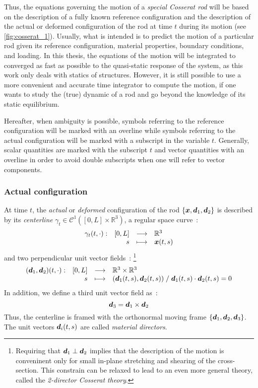 Thus, the equations governing the motion of a \emph{special Cosserat rod} will be based on the description of a fully known reference configuration and the description of the actual or deformed configuration of the rod at time $t$ during its motion (see \cref{fig:cosserat_1}). Usually, what is intended is to predict the motion of a particular rod given its reference configuration, material properties, boundary conditions, and loading. In this thesis, the equations of the motion will be integrated to converged as fast as possible to the quasi-static response of the system, as this work only deals with statics of structures. However, it is still possible to use a more convenient and accurate time integrator to compute the motion, if  one wants to study the (true) dynamic of a rod and go beyond the knowledge of its static equilibrium.

Hereafter, when ambiguity is possible, symbols referring to the reference configuration will be marked with an overline while symbols referring to the actual configuration will be marked with a subscript in the variable $t$. Generally, scalar quantities are marked with the subscript $t$ and vector quantities with an overline in order to avoid double subscripts when one will refer to vector components.

\subsubsection{Actual configuration}

At time $t$, the \emph{actual} or \emph{deformed} configuration of the rod $\{{\boldsymbol{x}}, {\boldsymbol{d}_1}, {\boldsymbol{d}_2}\}$ is described by its \emph{centerline} $\gamma_t \in \mathcal{C}^1([0,{L}]\times \mathbb{R}^3)$, a regular space curve~: 
\begin{equation}
	\begin{array}{lrcl} \gamma_t(t, \cdot): & [0,{L}] & \longrightarrow & \mathbb{R}^3 \\ & {s} & \longmapsto & \boldsymbol{x}(t,{s}) \end{array}
\end{equation}
and two perpendicular unit vector fields~: \footnote{Requiring that  $\boldsymbol{d}_1 \perp \boldsymbol{d}_2$ implies that the description of the motion is conveninent only for small in-plane stretching and shearing of the cross-section. This constrain can be relaxed to lead to an even more general theory, called the \emph{2-director Cosserat theory}.}
\begin{equation}
	\begin{array}{lrcl} (\boldsymbol{d}_1,\boldsymbol{d}_2)(t, \cdot): & [0,{L}] & \longrightarrow & \mathbb{R}^3 \times \mathbb{R}^3 \\ & {s} & \longmapsto & (\boldsymbol{d}_1(t,{s}), \boldsymbol{d}_2(t,{s})) \; / \; 
	\boldsymbol{d}_1(t,{s}) \cdot \boldsymbol{d}_2(t,{s}) = 0
	 \end{array}
\end{equation}
In addition, we define a third unit vector field as~: 
\begin{equation}
	\boldsymbol{d}_3 = \boldsymbol{d}_1 \times \boldsymbol{d}_2
\end{equation}
Thus, the centerline is framed with the orthonormal moving frame $\{\boldsymbol{d}_1, \boldsymbol{d}_2, \boldsymbol{d}_3\}$. The unit vectors $\boldsymbol{d}_i(t,{s})$ are called \emph{material directors}.

